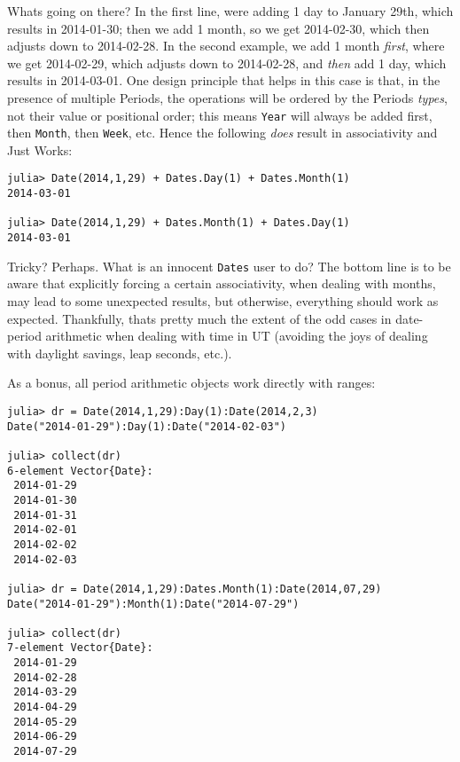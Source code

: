 What{\textquotesingle}s going on there? In the first line, we{\textquotesingle}re adding 1 day to January 29th, which results in 2014-01-30; then we add 1 month, so we get 2014-02-30, which then adjusts down to 2014-02-28. In the second example, we add 1 month \emph{first}, where we get 2014-02-29, which adjusts down to 2014-02-28, and \emph{then} add 1 day, which results in 2014-03-01. One design principle that helps in this case is that, in the presence of multiple Periods, the operations will be ordered by the Periods{\textquotesingle} \emph{types}, not their value or positional order; this means \texttt{Year} will always be added first, then \texttt{Month}, then \texttt{Week}, etc. Hence the following \emph{does} result in associativity and Just Works:




\begin{verbatim}
julia> Date(2014,1,29) + Dates.Day(1) + Dates.Month(1)
2014-03-01

julia> Date(2014,1,29) + Dates.Month(1) + Dates.Day(1)
2014-03-01
\end{verbatim}



Tricky? Perhaps. What is an innocent \texttt{Dates} user to do? The bottom line is to be aware that explicitly forcing a certain associativity, when dealing with months, may lead to some unexpected results, but otherwise, everything should work as expected. Thankfully, that{\textquotesingle}s pretty much the extent of the odd cases in date-period arithmetic when dealing with time in UT (avoiding the {\textquotedbl}joys{\textquotedbl} of dealing with daylight savings, leap seconds, etc.).



As a bonus, all period arithmetic objects work directly with ranges:




\begin{verbatim}
julia> dr = Date(2014,1,29):Day(1):Date(2014,2,3)
Date("2014-01-29"):Day(1):Date("2014-02-03")

julia> collect(dr)
6-element Vector{Date}:
 2014-01-29
 2014-01-30
 2014-01-31
 2014-02-01
 2014-02-02
 2014-02-03

julia> dr = Date(2014,1,29):Dates.Month(1):Date(2014,07,29)
Date("2014-01-29"):Month(1):Date("2014-07-29")

julia> collect(dr)
7-element Vector{Date}:
 2014-01-29
 2014-02-28
 2014-03-29
 2014-04-29
 2014-05-29
 2014-06-29
 2014-07-29
\end{verbatim}



